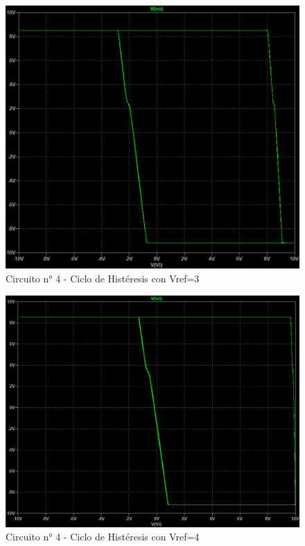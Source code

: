 \begin{figure}[h!]
    \centering
    \includegraphics[width=1.0\linewidth]{Secciones/Circuito4/Circuito 4 - Vref3.png}
    \caption{Circuito n° 4 - Ciclo de Histéresis con Vref=3}
    \label{fig:enter-label}
\end{figure}

\begin{figure}[h!]
    \centering
    \includegraphics[width=1.0\linewidth]{Secciones/Circuito4/Circuito 4 - Vref4.png}
    \caption{Circuito n° 4 - Ciclo de Histéresis con Vref=4}
    \label{fig:enter-label}
\end{figure}